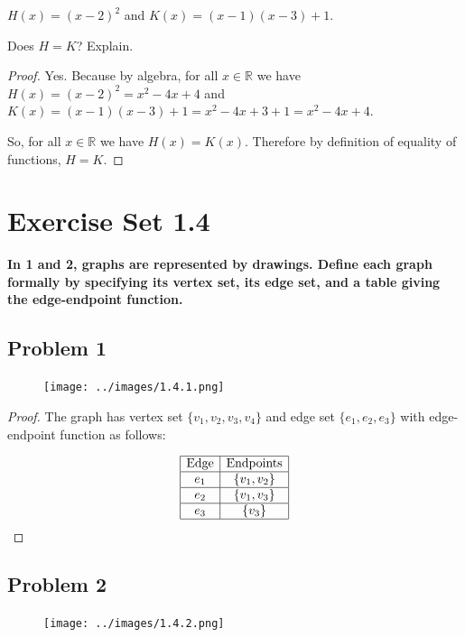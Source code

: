 \documentclass[14pt]{extarticle}
\newcommand{\R}{\mathbb{R}}
\begin{document}
\begin{center}
$H(x) = (x - 2)^2$ and $K(x) = (x - 1)(x - 3) + 1$.
\end{center}

Does $H = K$? Explain.

\begin{proof}
Yes. Because by algebra, for all $x \in \R$ we have
$H(x) = (x - 2)^2 = x^2 - 4x + 4$ and
$K(x) = (x - 1)(x - 3) + 1 = x^2 - 4x + 3 + 1 = x^2 - 4x + 4$.

So, for all $x \in \R$ we have $H(x) = K(x)$. Therefore by definition of
equality of functions, $H = K$.
\end{proof}

\section {Exercise Set 1.4}

{\bf In 1 and 2, graphs are represented by drawings. Define each graph
formally by specifying its vertex set, its edge set, and a table giving the
edge-endpoint function.}

\subsection{Problem 1}

\begin{figure}[ht!]
\centering
\texttt{[image: ../images/1.4.1.png]}
\end{figure}

\begin{proof}
The graph has vertex set $\{v_1, v_2, v_3, v_4\}$ and edge set
$\{e_1, e_2, e_3\}$ with edge-endpoint function as follows:

$$
\begin{array}{|c|c|}
\hline
\text{Edge} & \text{Endpoints} \\
\hline
e_1 & \{v_1, v_2\} \\
\hline
e_2 & \{v_1, v_3\} \\
\hline
e_3 & \{v_3\} \\
\hline
\end{array}
$$
\end{proof}

\subsection{Problem 2}

\begin{figure}[ht!]
\centering
\texttt{[image: ../images/1.4.2.png]}
\end{figure}
\end{document}

